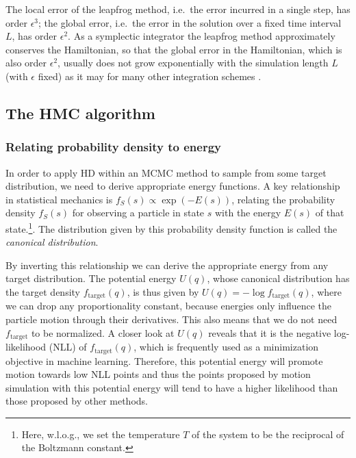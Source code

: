 The local error of the leapfrog method, i.e.\ the error incurred in a single step, has order $\epsilon^3$; the global error, i.e.\ the error in the solution over a fixed time interval $L$, has order $\epsilon^2$. As a symplectic integrator the leapfrog method approximately conserves the Hamiltonian, so that the global error in the Hamiltonian, which is also order $\epsilon^2$, usually does not grow exponentially with the simulation length $L$ (with $\epsilon$ fixed) as it may for many other integration schemes \parencite{Neal2011}.

\subsection{The HMC algorithm}
\label{sec:HMCAlgorithmSection}
\subsubsection{Relating probability density to energy}
In order to apply HD within an MCMC method to sample from some target distribution, we need to derive appropriate energy functions. A key relationship in statistical mechanics is $f_S(s) \propto \exp \left(- E(s) \right)$, relating the probability density $f_S(s)$ for observing a particle in state $s$ with the energy $E(s)$ of that state.\footnote{Here, w.l.o.g., we set the temperature $T$ of the system to be the reciprocal of the Boltzmann constant.}. The distribution given by this probability density function is called the \textit{canonical distribution}.

By inverting this relationship we can derive the appropriate energy from any target distribution. The potential energy $U(q)$, whose canonical distribution has the target density $f_\textrm{target}(q)$, is thus given by $U(q) = -\log f_\textrm{target}(q)$, where we can drop any proportionality constant, because energies only influence the particle motion through their derivatives. This also means that we do not need $f_\textrm{target}$ to be normalized. A closer look at $U(q)$ reveals that it is the negative log-likelihood (NLL) of $f_\textrm{target}(q)$, which is frequently used as a minimization objective in machine learning. Therefore, this potential energy will promote motion towards low NLL points and thus the points proposed by motion simulation with this potential energy will tend to have a higher likelihood than those proposed by other methods.

